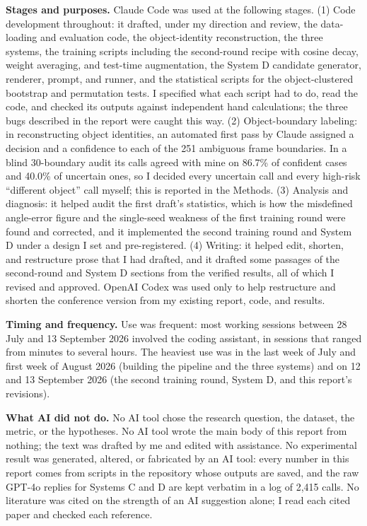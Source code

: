 \textbf{Stages and purposes.} Claude Code was used at the following stages.
(1) Code development throughout: it drafted, under my direction and
review, the data-loading and evaluation code, the object-identity
reconstruction, the three systems, the training scripts including the
second-round recipe with cosine decay, weight averaging, and test-time
augmentation, the System D candidate generator, renderer, prompt, and
runner, and the statistical scripts for the object-clustered bootstrap and
permutation tests. I specified what each script had to do, read the code,
and checked its outputs against independent hand calculations; the three
bugs described in the report were caught this way. (2) Object-boundary
labeling: in reconstructing object identities, an automated first pass by
Claude assigned a decision and a confidence to each of the 251 ambiguous
frame boundaries. In a blind 30-boundary audit its calls agreed with mine
on 86.7\% of confident cases and 40.0\% of uncertain ones, so I decided
every uncertain call and every high-risk ``different object'' call
myself; this is reported in the Methods. (3) Analysis and diagnosis: it
helped audit the first draft's statistics, which is how the misdefined
angle-error figure and the single-seed weakness of the first training
round were found and corrected, and it implemented the second training
round and System D under a design I set and pre-registered. (4) Writing:
it helped edit, shorten, and restructure prose that I had drafted, and it
drafted some passages of the second-round and System D sections from the
verified results, all of which I revised and approved. OpenAI Codex was
used only to help restructure and shorten the conference version from my
existing report, code, and results.

\textbf{Timing and frequency.} Use was frequent: most working sessions
between 28 July and 13 September 2026 involved the coding assistant, in
sessions that ranged from minutes to several hours. The heaviest use was
in the last week of July and first week of August 2026 (building the
pipeline and the three systems) and on 12 and 13 September 2026 (the
second training round, System D, and this report's revisions).

\textbf{What AI did not do.} No AI tool chose the research question,
the dataset, the metric, or the hypotheses. No AI tool wrote the main
body of this report from nothing; the text was drafted by me and edited
with assistance. No experimental result was generated, altered, or
fabricated by an AI tool: every number in this report comes from scripts
in the repository whose outputs are saved, and the raw GPT-4o replies for
Systems C and D are kept verbatim in a log of 2,415 calls. No literature
was cited on the strength of an AI suggestion alone; I read each cited
paper and checked each reference.

